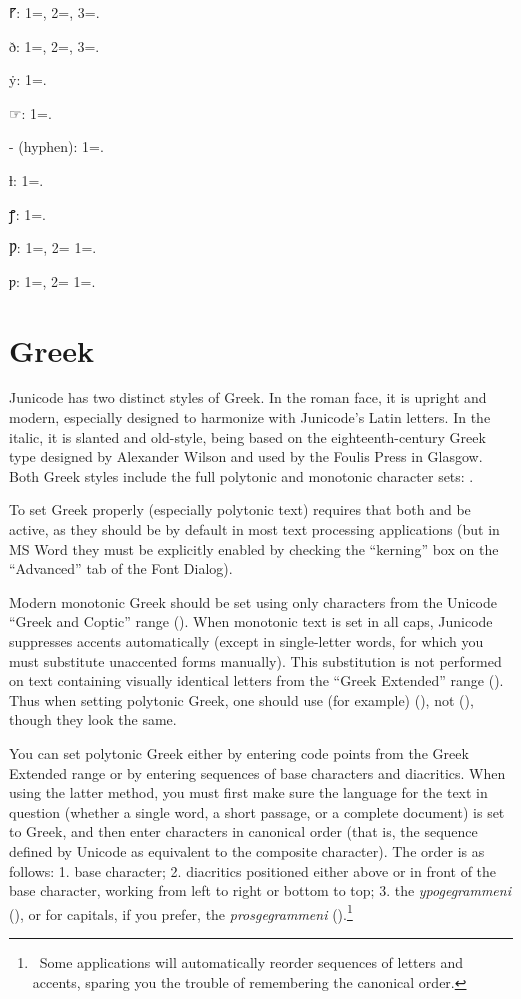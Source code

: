 \begin{multicols}{2}
\color{GGOrange} ⹍: 1=, 2=, 3=.

{ð: 1=, 2=, 3=.}

ẏ: 1=.

☞: 1=.

- (hyphen): 1=.

ƚ: 1=.

ꝭ: 1=.

Ƿ: 1=, 2= 1=.

ƿ: 1=, 2= 1=.
\end{multicols}


\section{Greek}
Junicode has two distinct styles of Greek. In the roman face, it is upright and
modern, especially designed to harmonize with Junicode's Latin letters. In the
italic, it is slanted and old-style, being based on the eighteenth-century
Greek type designed by Alexander Wilson and used by the Foulis Press in
Glasgow. Both Greek styles include the full polytonic and monotonic character
sets: .

To set Greek properly (especially polytonic text) requires that both 
and  be active, as they should be by default in most
text processing applications (but in MS Word they must be explicitly enabled
by checking the “kerning” box on the “Advanced” tab of the Font Dialog).

Modern monotonic Greek should be set using only characters from the Unicode “Greek
and Coptic” range (). When monotonic text is set in all caps, Junicode
suppresses accents automatically (except in single-letter words, for which
you must substitute unaccented forms manually). This substitution is not
performed on text containing visually identical letters from the “Greek Extended”
range ().
Thus when setting polytonic Greek, one should use (for example) 
(), not  (),
though they look the same.

You can set polytonic Greek either by entering code points from the Greek
Extended range or by entering sequences of base characters and diacritics.
When using the latter method, you must first make sure the language for the
text in question (whether a single word, a short passage, or a complete
document) is set to Greek, and then enter characters in canonical order
(that is, the sequence defined by Unicode as equivalent to the composite
character). The order is as follows: 1. base character; 2. diacritics
positioned either above or in front of the base character, working from left
to right or bottom to top; 3. the \textit{ypogegrammeni} (), or for
capitals, if you prefer, the \textit{prosgegrammeni} ().\footnote{\ Some
applications will automatically reorder sequences of letters and accents,
sparing you the trouble of remembering the canonical order.}


